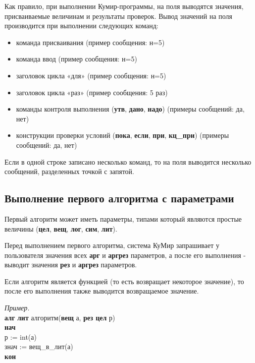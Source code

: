 Как правило, при выполнении Кумир-программы, на поля выводятся значения, присваиваемые величинам и результаты проверок. Вывод значений на поля производится при выполнении следующих команд:
\begin{itemize}
\item команда присваивания (пример сообщения: \textsf{н=5})
\item команда ввод (пример сообщения: \textsf{н=5})
\item заголовок цикла «для» (пример сообщения: \textsf{н=5}) 
\item заголовок цикла «раз» (пример сообщения: \textsf{5 раз})
\item команды контроля выполнения (\textsf{\textbf{утв}}, \textsf{\textbf{дано}}, \textsf{\textbf{надо}}) (примеры сообщений: \textsf{да}, \textsf{нет}) 
\item конструкции проверки условий (\textsf{\textbf{пока}}, \textsf{\textbf{если}}, \textsf{\textbf{при}}, \textsf{\textbf{кц\_при}}) (примеры сообщений: \textsf{да}, \textsf{нет}) 
\end{itemize}

Если в одной строке записано несколько команд, то на поля выводится несколько сообщений, разделенных точкой с запятой.

\subsection{Выполнение первого алгоритма с параметрами}
\label{FirstAlg}

Первый алгоритм может иметь параметры, типами который являются простые величины (\textbf{цел}, \textbf{вещ}, \textbf{лог}, \textbf{сим}, \textbf{лит}).

Перед выполнением первого алгоритма, система КуМир запрашивает у пользователя значения всех \textbf{арг} и \textbf{аргрез} параметров,
а после его выполнения - выводит значения \textbf{рез} и \textbf{аргрез} параметров.

Если алгоритм является функцией (то есть возвращает некоторое значение), то после его выполнения также выводится возвращаемое значение.

\emph{Пример.}\\
{
\sffamily
\textbf{алг} \textbf{лит} алгоритм(\textbf{вещ} а, \textbf{рез цел} р)\\
\textbf{нач}\\
\otstup р := int(а)\\
\otstup знач := вещ\_в\_лит(а)\\
\textbf{кон}
}

